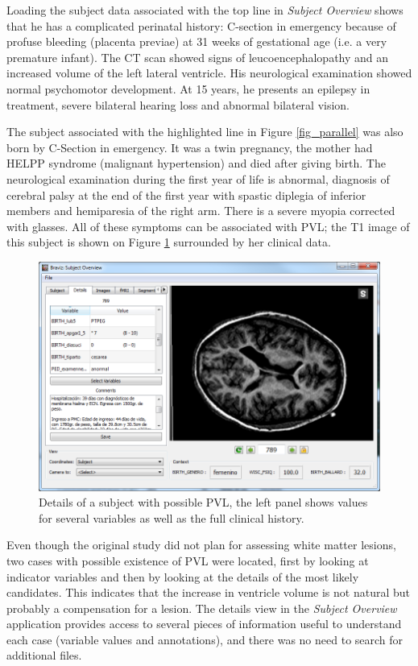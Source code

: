\documentclass[twocolumn]{svjour3}
\begin{document}
Loading the subject data associated with the top line in \emph{Subject Overview} shows that he has a complicated perinatal history: C-section in emergency because of profuse bleeding (placenta previae) at 31 weeks of gestational age (i.e. a very premature infant). The  CT scan showed signs of leucoencephalopathy  and an  increased volume of the left lateral ventricle. His neurological examination showed normal psychomotor development. At 15 years, he presents an epilepsy in  treatment, severe bilateral hearing loss and abnormal bilateral vision.  

The subject associated with the highlighted line in Figure \ref{fig_parallel} was also born by C-Section in emergency. It was a twin pregnancy, the mother had HELPP syndrome (malignant hypertension) and died after giving birth. The neurological examination during the first year of life is abnormal, diagnosis of cerebral palsy at the end of the first year with spastic diplegia of inferior members and hemiparesia of the right arm.  There is a severe myopia corrected with glasses. All of these symptoms can be associated with PVL; the T1 image of this subject is shown on Figure \ref{fig_subject3} surrounded by her clinical data.

\begin{figure}
\begin{center}
\includegraphics[width=\linewidth]{pvl_details}
\end{center}
 \caption{\label{fig_subject3}Details of a subject with possible PVL, the left panel shows values for several variables as well as the full clinical history.}
\end{figure}

Even though the original study did not plan for assessing white matter lesions, two cases with possible existence of PVL were located, first by looking at indicator variables and then by looking at the details of the most likely candidates. This indicates that the increase in ventricle volume is not natural but probably a compensation for a lesion. The details view in the \emph{Subject Overview} application provides access to several pieces of information useful to  understand each case (variable values and annotations), and there was no need to search for additional files. 
\end{document}
